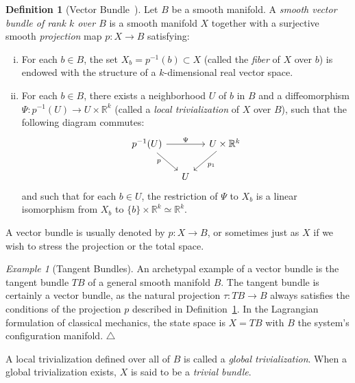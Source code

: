 \documentclass{article}
\theoremstyle{definition}
\newtheorem{definition}{Definition}
\theoremstyle{remark}
\newtheorem{example}{Example}
\newcommand\xqed[1]{%
  \leavevmode\unskip\penalty9999 \hbox{}\nobreak\hfill
  \quad\hbox{#1}}
\newcommand\eexa{\xqed{$\triangle$}}
\newcommand{\BA}{B}	%
\newcommand{\MA}{X}	%
\newcommand{\NE}{U}	%
\newcommand{\RR}{\mathbb{R}}	%
\begin{document}
\begin{definition}[Vector Bundle~{\cite[Ch. 5]{lee}}] \label{def:v_bundle}
 Let $\BA$ be a smooth manifold. A \emph{smooth vector bundle of rank $k$ over $\BA$} is
 a smooth manifold $\MA$ together with a surjective smooth \emph{projection} map $p: \MA \to \BA$
 satisfying:
 \begin{enumerate}[i)]
  \item For each $b \in \BA$, the set $\MA_b = p^{-1}(b) \subset \MA$ (called the \emph{fiber} of $\MA$ over $b$)
   is endowed with the structure of a $k$-dimensional real vector space.
  \item For each $b \in \BA$, there exists a neighborhood $\NE$ of $b$ in $\BA$ and a diffeomorphism
   $\Psi: p^{-1}(\NE) \to \NE\times \RR^k$ (called a \emph{local trivialization} of $\MA$ over $\BA$), such that the
   following diagram commutes:
   \begin{displaymath}
   \begin{tikzcd}[column sep=small]
    p^{-1}(\NE) \arrow{rd}[left, inner sep=1.5 ex]{p} \arrow{rr}{\Psi} &     & \NE\times\RR^k \arrow{ld}{p_1} \\
                                                                       & \NE & 
   \end{tikzcd} %
   \end{displaymath}
   and such that for each $b \in \NE$, the restriction of $\Psi$
   to $\MA_b$ is a linear isomorphism from $\MA_b$ to $\{b\}\times\RR^k \simeq \RR^k$.
 \end{enumerate}
\end{definition}

A vector bundle is usually denoted by $p :  \MA \to \BA$, or sometimes just as $\MA$ if we wish to stress the projection or
the total space.

\begin{example}[Tangent Bundles]
 An archetypal example of a vector bundle is the tangent bundle $T\BA$ of a general smooth manifold $\BA$. The tangent bundle is
 certainly a vector bundle, as the natural projection $\tau : T\BA \to \BA$ always satisfies the conditions of the projection $p$
 described in Definition~\ref{def:v_bundle}. In the Lagrangian formulation of classical mechanics, the state space is $\MA = T\BA$ 
 with $\BA$ the system's configuration manifold. \eexa
\end{example}

A local trivialization defined over all of $\BA$ is called a \emph{global trivialization}. When a global trivialization exists,
$\MA$ is said to be a \emph{trivial bundle}.
\end{document}
